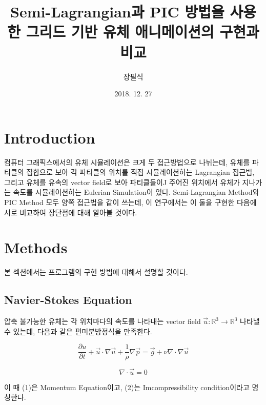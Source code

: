 \documentclass[11pt, A4]{article}
\title{Semi-Lagrangian과 PIC 방법을 사용한 그리드 기반 유체 애니메이션의 구현과 비교}
\author{장필식}
\date{2018. 12. 27}
\begin{document}
\maketitle

\begin{abstract}

\end{abstract}

\newpage

\tableofcontents

\newpage

\section{Introduction}

컴퓨터 그래픽스에서의 유체 시뮬레이션은 크게 두 접근방법으로 나뉘는데, 유체를 파티클의 집합으로 보아 각 파티클의 위치를 직접 시뮬레이션하는 Lagrangian 접근법, 그리고 유체를 유속의 vector field로 보아 파티클들이J 주어진 위치에서 유체가 지나가는 속도를 시뮬레이션하는 Eulerian Simulation이 있다. Semi-Lagrangian Method와 PIC Method 모두 양쪽 접근법을 같이 쓰는데, 이 연구에서는 이 둘을 구현한 다음에 서로 비교하여 장단점에 대해 알아볼 것이다.

\section{Methods}

본 섹션에서는 프로그램의 구현 방법에 대해서 설명할 것이다.

\subsection{Navier-Stokes Equation}

압축 불가능한 유체는 각 위치마다의 속도를 나타내는 vector field $\vec{u} : \mathbb{R}
^3 \rightarrow \mathbb{R}^3$ 나타낼 수 있는데, 다음과 같은 편미분방정식을 만족한다.

\begin{equation}
  \frac{\partial u}{\partial t} + \vec{u} \cdot \nabla{\vec{u}} + \frac{1}{\rho} \nabla{\vec{p}} = \vec{g} + \nu \nabla \cdot \nabla \vec{u}
\end{equation}

\begin{equation}
  \nabla \cdot \vec{u} = 0
\end{equation}

이 때 (1)은 Momentum Equation이고, (2)는 Imcompressibility condition이라고 명칭한다. 
\end{document}
